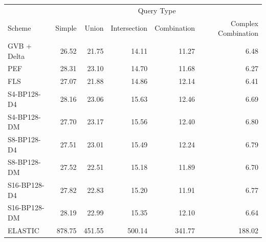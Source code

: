 \begin{tabular}{lrrrrr}
\toprule
 & \multicolumn{5}{c}{Query Type} \\
Scheme & Simple & Union & Intersection & Combination & Complex Combination \\
\midrule
GVB + Delta & 26.52 & 21.75 & 14.11 & 11.27 & 6.48 \\
PEF & 28.31 & 23.10 & 14.70 & 11.68 & 6.27 \\
FLS & 27.07 & 21.88 & 14.86 & 12.14 & 6.41 \\
S4-BP128-D4 & 28.16 & 23.06 & 15.63 & 12.46 & 6.69 \\
S4-BP128-DM & 27.70 & 23.17 & 15.56 & 12.40 & 6.80 \\
S8-BP128-D4 & 27.51 & 23.01 & 15.49 & 12.24 & 6.79 \\
S8-BP128-DM & 27.52 & 22.51 & 15.18 & 11.89 & 6.70 \\
S16-BP128-D4 & 27.82 & 22.83 & 15.20 & 11.91 & 6.77 \\
S16-BP128-DM & 28.19 & 22.99 & 15.35 & 12.10 & 6.64 \\
ELASTIC & 878.75 & 451.55 & 500.14 & 341.77 & 188.02 \\
\bottomrule
\end{tabular}
